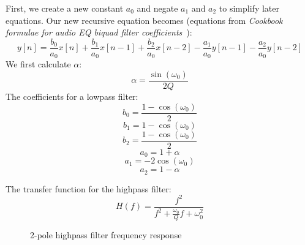 \documentclass[11pt,a4paper]{article}
\begin{document}
First, we create a new constant $a_0$ and negate $a_1$ and $a_2$ to simplify later equations. Our new recursive equation becomes (equations from \emph{Cookbook formulae for audio EQ biquad filter coefficients}~\cite{Cookbook}):
\begin{equation}
y[n] = \frac{b_0}{a_0}x[n] + \frac{b_1}{a_0}x[n-1] + \frac{b_2}{a_0}x[n-2] - \frac{a_1}{a_0}y[n-1] - \frac{a_2}{a_0}y[n-2]
\end{equation}
We first calculate $\alpha$:
\begin{equation}
\alpha = \frac{\sin(\omega_0)}{2Q}
\end{equation}
The coefficients for a lowpass filter:
\begin{equation}
b_0 = \frac{1 - \cos(\omega_0)}{2}
\end{equation}
\begin{equation}
b_1 = 1 - \cos(\omega_0)
\end{equation}
\begin{equation}
b_2 = \frac{1 - \cos(\omega_0)}{2}
\end{equation}
\begin{equation}
a_0 = 1 + \alpha
\end{equation}
\begin{equation}
a_1 = -2\cos(\omega_0)
\end{equation}
\begin{equation}
a_2 = 1 - \alpha
\end{equation}

The transfer function for the highpass filter:
\begin{equation}
H(f) = \frac{f^2}{f^2 + \frac{\omega_0}{Q}f + \omega_0^2}
\end{equation}


\begin{figure}[ht]
\caption{2-pole highpass filter frequency response}
\centering
{}

\end{figure}
\end{document}
